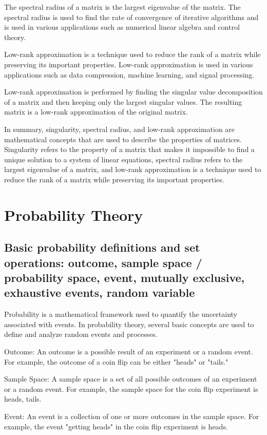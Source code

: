 \documentclass[12pt, a4paper, oneside]{article}
\begin{document}
The spectral radius of a matrix is the largest eigenvalue of the matrix. The spectral radius is used to find the rate of convergence of iterative algorithms and is used in various applications such as numerical linear algebra and control theory.

Low-rank approximation is a technique used to reduce the rank of a matrix while preserving its important properties. Low-rank approximation is used in various applications such as data compression, machine learning, and signal processing.

Low-rank approximation is performed by finding the singular value decomposition of a matrix and then keeping only the largest singular values. The resulting matrix is a low-rank approximation of the original matrix.

In summary, singularity, spectral radius, and low-rank approximation are mathematical concepts that are used to describe the properties of matrices. Singularity refers to the property of a matrix that makes it impossible to find a unique solution to a system of linear equations, spectral radius refers to the largest eigenvalue of a matrix, and low-rank approximation is a technique used to reduce the rank of a matrix while preserving its important properties.




\section{Probability Theory}
\subsection{ Basic probability definitions and set operations: outcome, sample space / probability space, event, mutually exclusive, exhaustive events, random variable  }
Probability is a mathematical framework used to quantify the uncertainty associated with events. In probability theory, several basic concepts are used to define and analyze random events and processes.

Outcome: An outcome is a possible result of an experiment or a random event. For example, the outcome of a coin flip can be either "heads" or "tails."

Sample Space: A sample space is a set of all possible outcomes of an experiment or a random event. For example, the sample space for the coin flip experiment is {heads, tails}.

Event: An event is a collection of one or more outcomes in the sample space. For example, the event "getting heads" in the coin flip experiment is {heads}.
\end{document}
